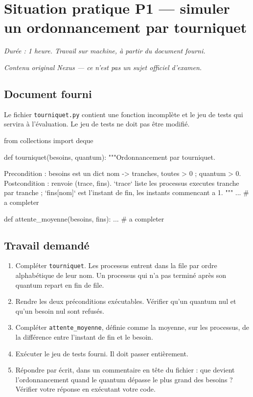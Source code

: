 \section*{Situation pratique P1 --- simuler un ordonnancement par tourniquet}

\textit{Durée : 1 heure. Travail sur machine, à partir du document fourni.}

\medskip
\textit{Contenu original Nexus --- ce n'est pas un sujet officiel d'examen.}

\subsection*{Document fourni}

Le fichier \lstinline{tourniquet.py} contient une fonction incomplète et le jeu
de tests qui servira à l'évaluation. Le jeu de tests ne doit pas être modifié.

\begin{python}
from collections import deque

def tourniquet(besoins, quantum):
    """Ordonnancement par tourniquet.

    Precondition  : besoins est un dict nom -> tranches, toutes > 0 ;
                    quantum > 0.
    Postcondition : renvoie (trace, fins). `trace` liste les processus
                    executes tranche par tranche ; `fins[nom]` est
                    l'instant de fin, les instants commencant a 1.
    """
    ...          # a completer

def attente_moyenne(besoins, fins):
    ...          # a completer
\end{python}

\subsection*{Travail demandé}

\begin{enumerate}
  \item Compléter \lstinline{tourniquet}. Les processus entrent dans la file par
    ordre alphabétique de leur nom. Un processus qui n'a pas terminé après son
    quantum repart en fin de file.

  \item Rendre les deux préconditions exécutables. Vérifier qu'un quantum nul
    et qu'un besoin nul sont refusés.

  \item Compléter \lstinline{attente_moyenne}, définie comme la moyenne, sur les
    processus, de la différence entre l'instant de fin et le besoin.

  \item Exécuter le jeu de tests fourni. Il doit passer entièrement.

  \item Répondre par écrit, dans un commentaire en tête du fichier : que devient
    l'ordonnancement quand le quantum dépasse le plus grand des besoins ?
    Vérifier votre réponse en exécutant votre code.
\end{enumerate}

